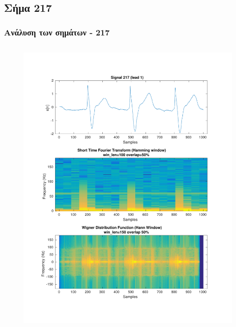 \documentclass{beamer}
\begin{document}
\subsection{Σήμα 217}
\label{sig:217}
\begin{frame}
\frametitle{Ανάλυση των σημάτων - 217}

\begin{columns}
\begin{figure}
\includegraphics[width=\textwidth]{fig/217l1_stft_wdf.pdf}
\end{figure}


\end{columns}
\end{frame}
\end{document}
